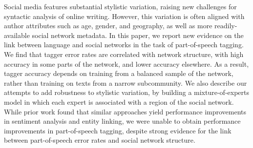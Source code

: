 Social media features substantial stylistic variation, raising new challenges for syntactic analysis of online writing. However, this variation is often aligned with author attributes such as age, gender, and geography, as well as more readily-available social network metadata. In this paper, we report new evidence on the link between language and social networks in the task of part-of-speech tagging. We find that tagger error rates are correlated with network structure, with high accuracy in some parts of the network, and lower accuracy elsewhere. As a result, tagger accuracy depends on training from a balanced sample of the network, rather than training on texts from a narrow subcommunity. We also describe our attempts to add robustness to stylistic variation, by building a mixture-of-experts model in which each expert is associated with a region of the social network. While prior work found that similar approaches yield performance improvements in sentiment analysis and entity linking, we were unable to obtain performance improvements in part-of-speech tagging, despite strong evidence for the link between part-of-speech error rates and social network structure.
